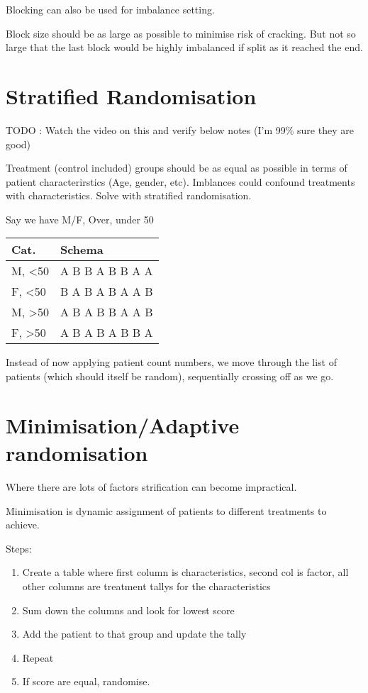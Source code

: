 \documentclass[
  letterpaper,
  DIV=11,
  numbers=noendperiod]{scrreprt}
\providecommand{\tightlist}{%
  \setlength{\itemsep}{0pt}\setlength{\parskip}{0pt}}\usepackage{longtable,booktabs,array}
\begin{document}
Blocking can also be used for imbalance setting.

Block size should be as large as possible to minimise risk of cracking.
But not so large that the last block would be highly imbalanced if split
as it reached the end.

\hypertarget{stratified-randomisation}{%
\section{Stratified Randomisation}\label{stratified-randomisation}}

TODO : Watch the video on this and verify below notes (I'm 99\% sure
they are good)

Treatment (control included) groups should be as equal as possible in
terms of patient characterirstics (Age, gender, etc). Imblances could
confound treatments with characteristics. Solve with stratified
randomisation.

Say we have M/F, Over, under 50

\begin{longtable}[]{@{}ll@{}}
\toprule()
Cat. & Schema \\
\midrule()
\endhead
M, \textless50 & A B B A B B A A \\
F, \textless50 & B A B A B A A B \\
M, \textgreater50 & A B A B B A A B \\
F, \textgreater50 & A B A B A B B A \\
\bottomrule()
\end{longtable}

Instead of now applying patient count numbers, we move through the list
of patients (which should itself be random), sequentially crossing off
as we go.

\hypertarget{minimisationadaptive-randomisation}{%
\section{Minimisation/Adaptive
randomisation}\label{minimisationadaptive-randomisation}}

Where there are lots of factors strification can become impractical.

Minimisation is dynamic assignment of patients to different treatments
to achieve.

Steps:

\begin{enumerate}
\def\labelenumi{\arabic{enumi})}
\tightlist
\item
  Create a table where first column is characteristics, second col is
  factor, all other columns are treatment tallys for the characteristics
\item
  Sum down the columns and look for lowest score
\item
  Add the patient to that group and update the tally
\item
  Repeat
\item
  If score are equal, randomise.
\end{enumerate}
\end{document}
